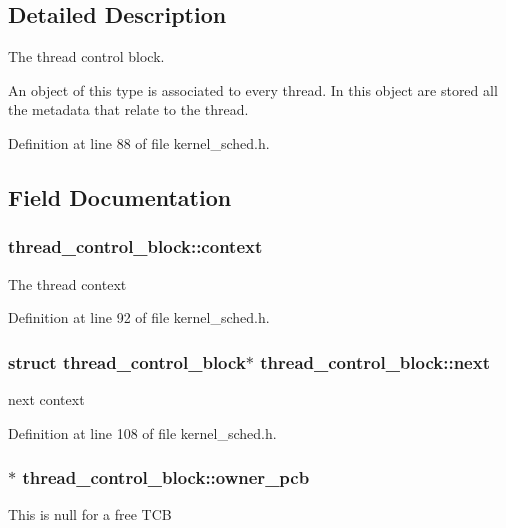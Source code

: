 \subsection{Detailed Description}
The thread control block. 

An object of this type is associated to every thread. In this object are stored all the metadata that relate to the thread. 

Definition at line 88 of file kernel\+\_\+sched.\+h.



\subsection{Field Documentation}
\subsubsection[{\texorpdfstring{context}{context}}]{ thread\+\_\+control\+\_\+block\+::context}\hypertarget{structthread__control__block_a9c107039dffa851dde6edabd6cd3f89c}{}\label{structthread__control__block_a9c107039dffa851dde6edabd6cd3f89c}
The thread context 

Definition at line 92 of file kernel\+\_\+sched.\+h.

\subsubsection[{\texorpdfstring{next}{next}}]{\setlength{\rightskip}{0pt plus 5cm}struct {\bf thread\+\_\+control\+\_\+block}$\ast$ thread\+\_\+control\+\_\+block\+::next}\hypertarget{structthread__control__block_ac6b51ca735291f730ca1d4c335fb9359}{}\label{structthread__control__block_ac6b51ca735291f730ca1d4c335fb9359}
next context 

Definition at line 108 of file kernel\+\_\+sched.\+h.

\subsubsection[{\texorpdfstring{owner\+\_\+pcb}{owner_pcb}}]{$\ast$ thread\+\_\+control\+\_\+block\+::owner\+\_\+pcb}\hypertarget{structthread__control__block_a74aa312623cb8be2bc719d5210b58c04}{}\label{structthread__control__block_a74aa312623cb8be2bc719d5210b58c04}
This is null for a free T\+CB 

